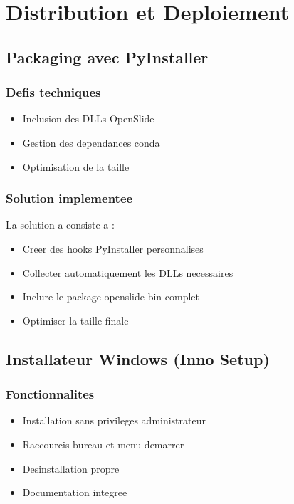 \documentclass[12pt,a4paper]{article}
\begin{document}
\section{Distribution et Deploiement}

\subsection{Packaging avec PyInstaller}

\subsubsection{Defis techniques}
\begin{itemize}
\item Inclusion des DLLs OpenSlide
\item Gestion des dependances conda
\item Optimisation de la taille
\end{itemize}

\subsubsection{Solution implementee}
La solution a consiste a :
\begin{itemize}
\item Creer des hooks PyInstaller personnalises
\item Collecter automatiquement les DLLs necessaires
\item Inclure le package openslide-bin complet
\item Optimiser la taille finale
\end{itemize}

\subsection{Installateur Windows (Inno Setup)}

\subsubsection{Fonctionnalites}
\begin{itemize}
\item Installation sans privileges administrateur
\item Raccourcis bureau et menu demarrer
\item Desinstallation propre
\item Documentation integree
\end{itemize}
\end{document}
